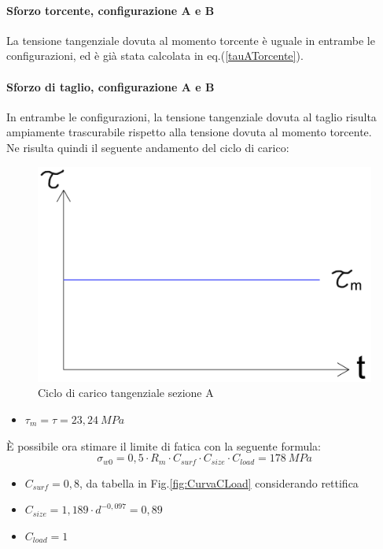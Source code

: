 \paragraph{Sforzo torcente, configurazione A e B} La tensione tangenziale dovuta al momento torcente è uguale in entrambe le configurazioni, ed è già stata calcolata in eq.(\ref{tauATorcente}). 
\paragraph{Sforzo di taglio, configurazione A e B} In entrambe le configurazioni, la tensione tangenziale dovuta al taglio risulta ampiamente trascurabile rispetto alla tensione dovuta al momento torcente. \\
Ne risulta quindi il seguente andamento del ciclo di carico:
\newpage
\begin{figure}[h]
    \centering
    \includegraphics[scale=0.35]{Immagini/CicloFaticaATangenziale.png}
    \caption{Ciclo di carico tangenziale sezione A}
    \label{fig:CicloFaticaATangenziale}
\end{figure}
\begin{itemize}
    \item $\tau_m=\tau=23,24\ MPa$
\end{itemize}
È possibile ora stimare il limite di fatica con la seguente formula:
\begin{equation}
    \sigma_{w0}=0,5\cdot R_m\cdot C_{surf}\cdot C_{size}\cdot C_{load}=178\ MPa
\end{equation}
\begin{itemize}
    \item $C_{surf}=0,8$, da tabella in Fig.\ref{fig:CurvaCLoad} considerando rettifica 
    \item $C_{size}=1,189\cdot d^{-0,097}=0,89$
    \item $C_{load}=1$
\end{itemize}
